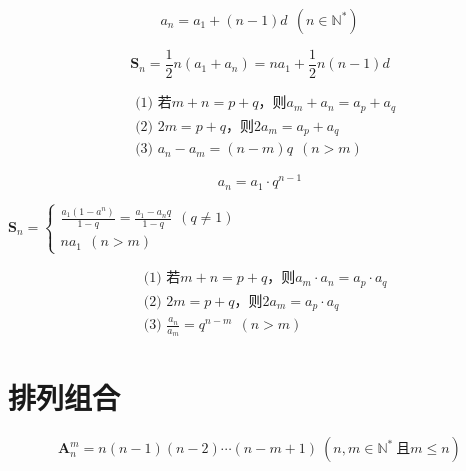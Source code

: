 \documentclass[a5paper]{article}
\begin{document}
\begin{equation*}
    a_n = a_1 + (n-1)d ~~(n \in \mathbb{N}^*)
\end{equation*}

\begin{equation*}
    \textbf{S}_n = \frac{1}{2}n(a_1 + a_n) = na_1 + \frac{1}{2}n(n-1)d
\end{equation*}

\begin{align*}
    & \text{(1) 若} m+n = p+q \text{，则} a_m + a_n = a_p + a_q \\
    & \text{(2)~} 2m = p+q \text{，则} 2a_m = a_p + a_q \\
    & \text{(3)~} a_n - a_m = (n-m)q ~~(n>m)
\end{align*}

\begin{equation*}
    a_n = a_1 \cdot q^{n-1}
\end{equation*}


\begin{center}
    \begin{math}
        \textbf{S}_n =
        \begin{cases}
            \frac{a_1(1-a^n)}{1-q} = \frac{a_1 - a_{n}q}{1-q} ~~(q \ne 1) \\
            na_1 ~~(n > m)
        \end{cases}
    \end{math}
\end{center}


\begin{align*}
    & \text{(1) 若} m+n = p+q \text{，则} a_m \cdot a_n = a_p \cdot a_q \\
    & \text{(2)~} 2m = p+q \text{，则} 2a_m = a_p \cdot a_q \\
    & \text{(3)~} \frac{a_n}{a_m} = q^{n-m} ~~(n>m)
\end{align*}

\section{{\large \textbf{排列组合}}}

\begin{equation*}
    \textbf{A}_{n}^{m} = n(n-1)(n-2)\cdots{}(n-m+1)~(n, m \in \mathbb{N}^{*}~\text{且}m \le n)
\end{equation*}
\end{document}
